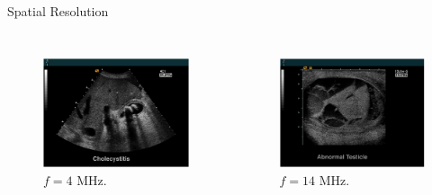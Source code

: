 \begin{frame}{Spatial Resolution \cont}

    \begin{columns}[b]
        \begin{figure}
            \centering
            \includegraphics[width=.95\columnwidth]{images/frequency_example_4MHz.png}\\
            {\Large $f = 4$ MHz.}
        \end{figure}

        \begin{figure}
            \centering
            \includegraphics[width=.95\columnwidth]{images/frequency_example_14MHz.png}\\
            {\Large $f = 14$ MHz.}
        \end{figure}
    \end{columns}

\end{frame}


